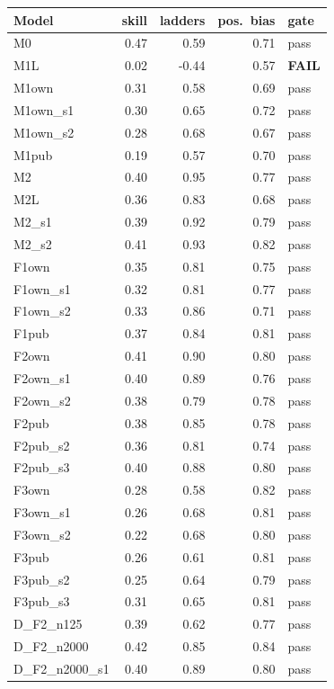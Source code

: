 \begin{table}[h]\centering\scriptsize
\begin{minipage}[t]{0.48\linewidth}\centering
\begin{tabular}{lrrrl}\toprule Model & skill & ladders & pos.\ bias & gate\\\midrule
M0 & 0.47 & 0.59 & 0.71 & pass\\
M1L & 0.02 & -0.44 & 0.57 & \textbf{FAIL}\\
M1own & 0.31 & 0.58 & 0.69 & pass\\
M1own\_s1 & 0.30 & 0.65 & 0.72 & pass\\
M1own\_s2 & 0.28 & 0.68 & 0.67 & pass\\
M1pub & 0.19 & 0.57 & 0.70 & pass\\
M2 & 0.40 & 0.95 & 0.77 & pass\\
M2L & 0.36 & 0.83 & 0.68 & pass\\
M2\_s1 & 0.39 & 0.92 & 0.79 & pass\\
M2\_s2 & 0.41 & 0.93 & 0.82 & pass\\
F1own & 0.35 & 0.81 & 0.75 & pass\\
F1own\_s1 & 0.32 & 0.81 & 0.77 & pass\\
F1own\_s2 & 0.33 & 0.86 & 0.71 & pass\\
F1pub & 0.37 & 0.84 & 0.81 & pass\\
F2own & 0.41 & 0.90 & 0.80 & pass\\
F2own\_s1 & 0.40 & 0.89 & 0.76 & pass\\
F2own\_s2 & 0.38 & 0.79 & 0.78 & pass\\
F2pub & 0.38 & 0.85 & 0.78 & pass\\
F2pub\_s2 & 0.36 & 0.81 & 0.74 & pass\\
F2pub\_s3 & 0.40 & 0.88 & 0.80 & pass\\
F3own & 0.28 & 0.58 & 0.82 & pass\\
F3own\_s1 & 0.26 & 0.68 & 0.81 & pass\\
F3own\_s2 & 0.22 & 0.68 & 0.80 & pass\\
F3pub & 0.26 & 0.61 & 0.81 & pass\\
F3pub\_s2 & 0.25 & 0.64 & 0.79 & pass\\
F3pub\_s3 & 0.31 & 0.65 & 0.81 & pass\\
D\_F2\_n125 & 0.39 & 0.62 & 0.77 & pass\\
D\_F2\_n2000 & 0.42 & 0.85 & 0.84 & pass\\
D\_F2\_n2000\_s1 & 0.40 & 0.89 & 0.80 & pass\\

\end{tabular}
\end{minipage}
\end{table}
